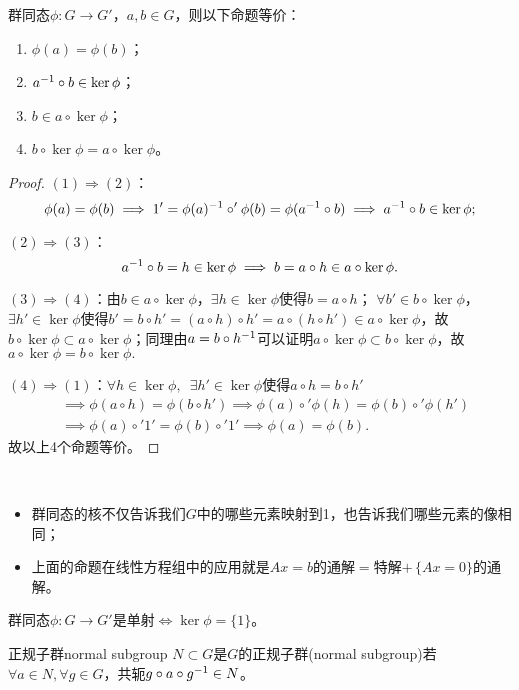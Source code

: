 \begin{theorem}{}{}
	群同态$\phi:G\to G'$，$a,b\in G$，则以下命题等价：
	\begin{enumerate}
		\item $\phi(a)=\phi(b)$；
		\item $a^{-1}\circ b\in\ker\phi$；
		\item $b\in a\circ\ker\phi$；
		\item $b\circ\ker\phi=a\circ\ker\phi$。
	\end{enumerate}
\end{theorem}
\begin{proof}
	$(1)\Rightarrow(2)$：
	\[
		\phi(a)=\phi(b)\implies 1'=\phi(a)^{-1}\circ'\phi(b)=\phi(a^{-1}\circ b)\implies a^{-1}\circ b\in\ker\phi;
	\]

	$(2)\Rightarrow(3)$：
	\[
		a^{-1}\circ b=h\in\ker\phi\implies b=a\circ h\in a\circ\ker\phi.
	\]

	$(3)\Rightarrow(4)$：由$b\in a\circ\ker\phi$，$\exists h\in\ker\phi$使得$b=a\circ h$；
	$\forall b'\in b\circ\ker\phi$，$\exists h'\in \ker\phi$使得$b'=b\circ h'=(a\circ h)\circ h'=a\circ(h\circ h')\in a\circ\ker\phi$，故$b\circ\ker\phi\subset a\circ\ker\phi$；同理由$a=b\circ h^{-1}$可以证明$a\circ\ker\phi\subset b\circ\ker\phi$，故$a\circ\ker\phi=b\circ\ker\phi.$

	$(4)\Rightarrow(1)$：$\forall h\in\ker\phi,\enspace\exists h'\in\ker\phi$使得$a\circ h=b\circ h'$
	\begin{align*}
		&\implies \phi(a\circ h)=\phi(b\circ h')\implies\phi(a)\circ'\phi(h)=\phi(b)\circ'\phi(h')\\
		&\implies\phi(a)\circ'1'=\phi(b)\circ'1'\implies\phi(a)=\phi(b).
	\end{align*}
	故以上4个命题等价。
\end{proof}
\begin{remark}~
	\begin{itemize}
		\item 群同态的核不仅告诉我们$G$中的哪些元素映射到1，也告诉我们哪些元素的像相同；
		\item 上面的命题在线性方程组中的应用就是$Ax=b$的通解$=$特解$+\,\{Ax=0\}$的通解。
	\end{itemize}
\end{remark}
\begin{corollary}
	群同态$\phi:G\to G'$是单射$\iff\ker\phi=\{1\}$。
\end{corollary}
\begin{definition}{正规子群}{normal subgroup}
	$N\subset G$是$G$的正规子群(normal subgroup)若$\forall a\in N,\forall g\in G$，共轭$g\circ a\circ g^{-1}\in N$。
\end{definition}
